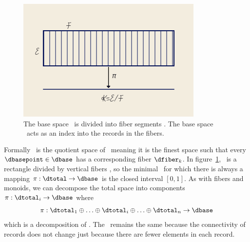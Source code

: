\documentclass[../main.tex]{subfiles}
\begin{document}
\begin{figure}[H]
    \includegraphics[width=.5\linewidth]{figures/math/k_qspace.png}
    \caption{The base space \dtotal\ is divided into fiber segments \dfiber. The base space \dbase\ acts as an index into the records in the fibers.}
    \label{fig:base_space_div}
\end{figure}

Formally \dbase\ is the quotient space \cite{QuotientSpaceTopology2020} of \dtotal\, meaning it is the finest space\cite{aurouxMath131Introduction} such that every $\dbasepoint \in \dbase$ has a corresponding fiber $\dfiber_k$\cite{QuotientSpaceTopology2020}. In figure~\ref{fig:base_space_div}, \dtotal\ is a rectangle divided by vertical fibers \dfiber, so the minimal \dbase\ for which there is always a mapping $\pi: \dtotal\rightarrow \dbase$ is the closed interval $\left[0,1\right]$. 
As with fibers and monoids, we can decompose the total space into components $\pi:\dtotal_i\rightarrow \dbase$ where
\begin{equation}
    \pi:\dtotal_1\oplus\ldots\oplus \dtotal_i \oplus\ldots \oplus \dtotal_n \rightarrow \dbase
\end{equation}
which is a decomposition of \dfiber. The \dbase\ remains the same because the connectivity of records does not change just because there are fewer elements in each record.
\end{document}
